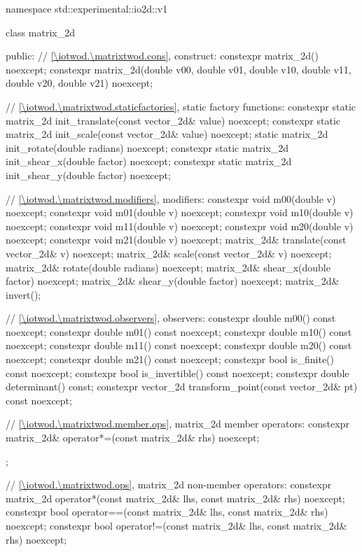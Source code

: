 \begin{codeblock}
namespace std::experimental::io2d::v1 {
  class matrix_2d {
  public:
    // \ref{\iotwod.\matrixtwod.cons}, construct:
    constexpr matrix_2d() noexcept;
    constexpr matrix_2d(double v00, double v01, double v10, double v11,
      double v20, double v21) noexcept;
    
    // \ref{\iotwod.\matrixtwod.staticfactories}, static factory functions:
    constexpr static matrix_2d init_translate(const vector_2d& value) noexcept;
    constexpr static matrix_2d init_scale(const vector_2d& value) noexcept;
    static matrix_2d init_rotate(double radians) noexcept;
    constexpr static matrix_2d init_shear_x(double factor) noexcept;
    constexpr static matrix_2d init_shear_y(double factor) noexcept;
    
    // \ref{\iotwod.\matrixtwod.modifiers}, modifiers:
    constexpr void m00(double v) noexcept;
    constexpr void m01(double v) noexcept;
    constexpr void m10(double v) noexcept;
    constexpr void m11(double v) noexcept;
    constexpr void m20(double v) noexcept;
    constexpr void m21(double v) noexcept;
    matrix_2d& translate(const vector_2d& v) noexcept;
    matrix_2d& scale(const vector_2d& v) noexcept;
    matrix_2d& rotate(double radians) noexcept;
    matrix_2d& shear_x(double factor) noexcept;
    matrix_2d& shear_y(double factor) noexcept;
    matrix_2d& invert();
    
    // \ref{\iotwod.\matrixtwod.observers}, observers:
    constexpr double m00() const noexcept;
    constexpr double m01() const noexcept;
    constexpr double m10() const noexcept;
    constexpr double m11() const noexcept;
    constexpr double m20() const noexcept;
    constexpr double m21() const noexcept;
    constexpr bool is_finite() const noexcept;
    constexpr bool is_invertible() const noexcept;
    constexpr double determinant() const;
    constexpr vector_2d transform_point(const vector_2d& pt) const noexcept;
    
    // \ref{\iotwod.\matrixtwod.member.ops}, matrix_2d member operators:
    constexpr matrix_2d& operator*=(const matrix_2d& rhs) noexcept;
  };
    
  // \ref{\iotwod.\matrixtwod.ops}, matrix_2d non-member operators:
  constexpr matrix_2d operator*(const matrix_2d& lhs, const matrix_2d& rhs)
    noexcept;
  constexpr bool operator==(const matrix_2d& lhs, const matrix_2d& rhs)
    noexcept;
  constexpr bool operator!=(const matrix_2d& lhs, const matrix_2d& rhs)
    noexcept;
}
\end{codeblock}

